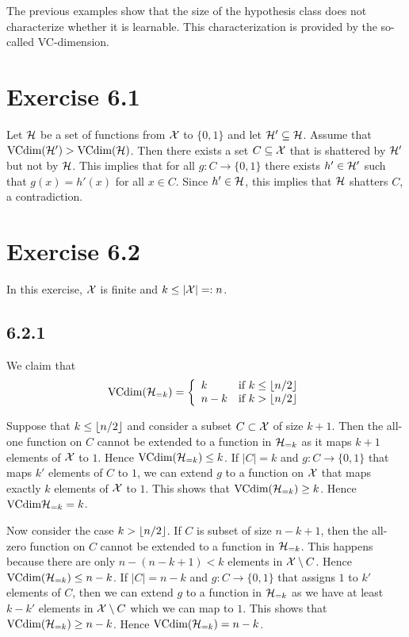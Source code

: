 The previous examples show that the size of the hypothesis class does not characterize
whether it is learnable. This characterization is provided by the so-called VC-dimension.

\section*{Exercise 6.1}

Let $\mathcal{H}$ be a set of functions from $\mathcal{X}$ to $\{0, 1\}$ and
let $\mathcal{H}' \subseteq \mathcal{H}$. Assume that $\text{VCdim} (\mathcal{H}') > \text{VCdim}
(\mathcal{H})$.  Then there exists a set $C \subseteq \mathcal{X}$ that is shattered by
$\mathcal{H}'$ but not by $\mathcal{H}$.  This implies that for all $g \colon C
\rightarrow \{0, 1\}$ there exists $h' \in \mathcal{H}'$ such that $g(x) = h'(x)$
for all $x \in C$. Since $h' \in \mathcal{H}$, this implies that $\mathcal{H}$
shatters $C$, a contradiction.

\section*{Exercise 6.2}

In this exercise, $\mathcal{X}$ is finite and $k \leq |\mathcal{X}| =: n$. 

\subsection*{6.2.1} 

We claim that 
\[\text{VCdim}(\mathcal{H}_{= k}) 
= \left \{ \begin{array}{ll} 
                k     & \text{if } k \leq \left \lfloor n / 2 \right \rfloor \\
                n - k & \text{if } k > \left \lfloor n / 2 \right \rfloor 
           \end{array} \right .
\]

Suppose that $k \leq \left \lfloor n / 2 \right \rfloor$ and consider a subset $C \subset \mathcal{X}$ 
of size $k + 1$. Then the all-one function on $C$ cannot be 
extended to a function in $\mathcal{H}_{= k}$ as it maps $k + 1$ elements
of $\mathcal{X}$ to $1$. Hence $\text{VCdim}(\mathcal{H}_{= k}) \leq k$. If $|C| = k$ 
and $g \colon C \rightarrow \{0, 1\}$ that maps $k'$ elements of $C$ to $1$,
we can extend $g$ to a function on $\mathcal{X}$ that maps exactly $k$ elements of 
$\mathcal{X}$ to $1$.  This shows that $\text{VCdim}(\mathcal{H}_{= k}) \geq k$. Hence 
$\text{VCdim}{\ensuremath{\mathcal{H}}_{= k}} = k$.

Now consider the case $k > \left \lfloor n / 2 \right \rfloor$. If $C$ is subset of size
$n - k + 1$, then the all-zero function on $C$ cannot be extended 
to a function in $\mathcal{H}_{= k}$. This happens because there are only 
$n - (n - k + 1) < k$ elements in $\mathcal{X} \setminus C$. Hence 
$\text{VCdim}(\mathcal{H}_{= k}) \leq n - k$. If $|C| = n - k$ and 
$g \colon C \rightarrow \{0, 1\}$ that assigns $1$ to $k'$ 
elements of $C$, then we can extend $g$ to a function in 
$\mathcal{H}_{= k}$ as we have at least $k - k'$ elements in 
$\mathcal{X} \setminus C$ which we can map to $1$. This shows that 
$\text{VCdim}(\mathcal{H}_{= k}) \geq n - k$. Hence 
$\text{VCdim}(\mathcal{H}_{= k}) = n - k$.

